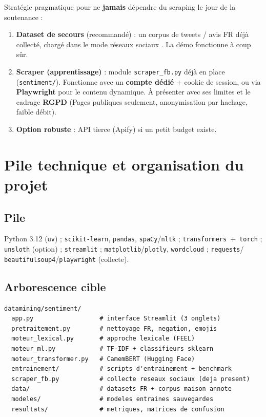 \documentclass[11pt,a4paper]{article}
\newcommand{\code}[1]{\texttt{\small #1}}
\begin{document}
Stratégie pragmatique pour ne \textbf{jamais} dépendre du scraping le jour de la
soutenance :
\begin{enumerate}[leftmargin=1.2cm,nosep]
  \item \textbf{Dataset de secours} (recommandé) : un corpus de tweets / avis FR
        déjà collecté, chargé dans le mode \og réseaux sociaux \fg{}. La démo
        fonctionne à coup sûr.
  \item \textbf{Scraper (apprentissage)} : module \code{scraper\_fb.py} déjà en
        place (\code{sentiment/}). Fonctionne avec un \textbf{compte dédié} +
        cookie de session, ou via \textbf{Playwright} pour le contenu dynamique.
        À présenter avec ses limites et le cadrage \textbf{RGPD} (Pages publiques
        seulement, anonymisation par hachage, faible débit).
  \item \textbf{Option robuste} : API tierce (Apify) si un petit budget existe.
\end{enumerate}

\section{Pile technique et organisation du projet}

\subsection{Pile}
Python 3.12 (\code{uv}) ; \code{scikit-learn}, \code{pandas}, \code{spaCy}/\code{nltk} ;
\code{transformers}~+~\code{torch} ; \code{unsloth} (option) ; \code{streamlit} ;
\code{matplotlib}/\code{plotly}, \code{wordcloud} ; \code{requests}/
\code{beautifulsoup4}/\code{playwright} (collecte).

\subsection{Arborescence cible}
{\scriptsize
\begin{verbatim}
datamining/sentiment/
  app.py                  # interface Streamlit (3 onglets)
  pretraitement.py        # nettoyage FR, negation, emojis
  moteur_lexical.py       # approche lexicale (FEEL)
  moteur_ml.py            # TF-IDF + classifieurs sklearn
  moteur_transformer.py   # CamemBERT (Hugging Face)
  entrainement/           # scripts d'entrainement + benchmark
  scraper_fb.py           # collecte reseaux sociaux (deja present)
  data/                   # datasets FR + corpus maison annote
  modeles/                # modeles entraines sauvegardes
  resultats/              # metriques, matrices de confusion
\end{verbatim}}
\end{document}
